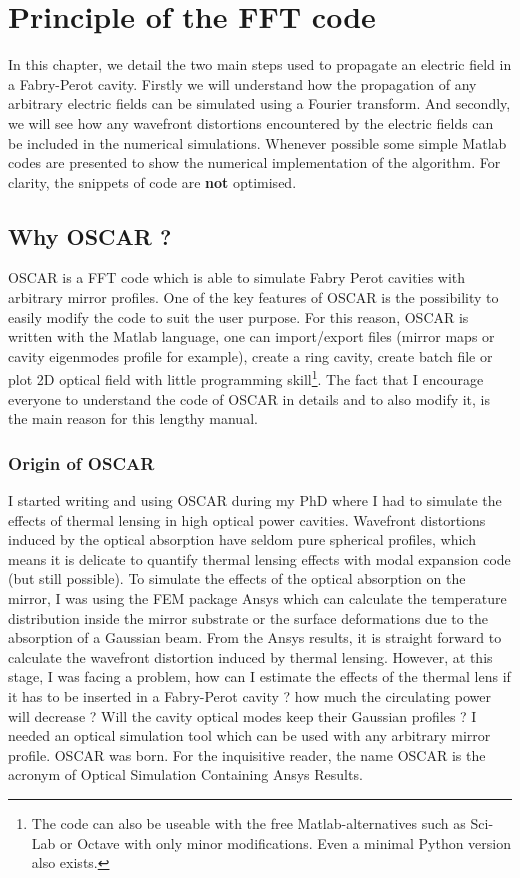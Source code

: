 \chapter{Principle of the FFT code}
\pagestyle{headings}

In this chapter, we detail the two main steps used to propagate an electric field in a Fabry-Perot cavity. Firstly we will understand how the propagation of any arbitrary electric fields can be simulated using a Fourier transform. And secondly, we will see how any wavefront distortions encountered by the electric fields can be included in the numerical simulations. Whenever possible some simple Matlab codes are presented to show the numerical implementation of the algorithm. For clarity, the snippets of code are \textbf{not} optimised.

\section{Why OSCAR ?}

OSCAR is a FFT code which is able to simulate Fabry Perot cavities with arbitrary mirror profiles. One of the key features of OSCAR is the possibility to easily modify the code to suit the user purpose. For this reason, OSCAR is written with the Matlab language, one can import/export files (mirror maps or cavity eigenmodes profile for example), create a ring cavity, create batch file or plot 2D optical field with little programming skill\footnote{The code  can also be useable with the free Matlab-alternatives such as Sci-Lab or Octave with only minor modifications. Even a minimal Python version also exists.}. The fact that I encourage everyone to understand the code of OSCAR in details and to also modify it, is the main reason for this lengthy manual.

\subsection{Origin of OSCAR}

I started writing and using OSCAR during my PhD where I had to simulate the effects of thermal lensing in high optical power cavities. Wavefront distortions induced by the optical absorption have seldom pure spherical profiles, which means it is delicate to quantify thermal lensing effects with modal expansion code (but still possible).
To simulate the effects of the optical absorption on the mirror, I was using the FEM package Ansys which can calculate the temperature distribution inside the mirror substrate or the surface deformations due to the absorption of a Gaussian beam. From the Ansys results, it is straight forward to calculate the wavefront distortion induced by thermal lensing. However, at this stage, I was facing a problem, how can I estimate the effects of the thermal lens if it has to be inserted in a Fabry-Perot cavity ? how much the circulating power will decrease ? Will the cavity optical modes keep their Gaussian profiles ? I needed an optical simulation tool which can be used with any arbitrary mirror profile. OSCAR was born. For the inquisitive reader, the name OSCAR is the acronym of Optical Simulation Containing Ansys Results.

